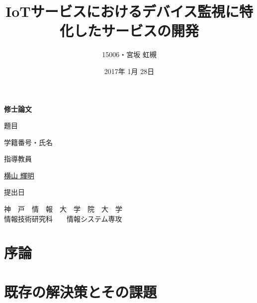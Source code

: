 \documentclass[a4paper]{jreport}
\begin{document}
\makeatletter

\title{IoTサービスにおけるデバイス監視に特化したサービスの開発}
\author{15006・宮坂 虹槻}
\date{2017年 1月 28日}
\def\@teacher{横山 輝明}

\begin{titlepage}\begin{center}
\thispagestyle{plain}
{\Huge \textbf{修士論文} \par}
\vspace{1.5cm}
{\LARGE\gt 題目 \par}
{\LARGE\gt \underline{\@title} \par}
\vspace{2.5cm}
{\LARGE\gt 学籍番号・氏名 \par}
\vspace{1.5cm}
{\LARGE \underline{\@author} \par}
\vspace{1.5cm}
{\LARGE\gt 指導教員 \par}
\vspace{1.5cm}
{\LARGE\gt \underline{\@teacher} \par}
\vspace{1.5cm}
{\LARGE\gt 提出日 \par}
\vspace{1.5cm}
{\LARGE\gt \underline{\@date} \par}
\vspace{1.5cm}
{\Large\gt
神　戸　情　報　大　学　院　大　学\\
情報技術研究科　　情報システム専攻\\
\par}
\end{center}\end{titlepage}
\restoregeometry
\makeatother

\tableofcontents

\begin{abstract}
\thispagestyle{plain}

\end{abstract}

\chapter{序論}


\chapter{既存の解決策とその課題}

\end{document}

